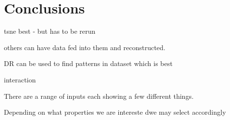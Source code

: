 \section{Conclusions}

tsne best - but has to be rerun

others can have data fed into them and reconstructed.




DR can be used to find patterns in dataset
which is best

interaction

There are a range of inputs
each showing a few different things.

Depending on what properties we are intereste dwe may select accordingly
